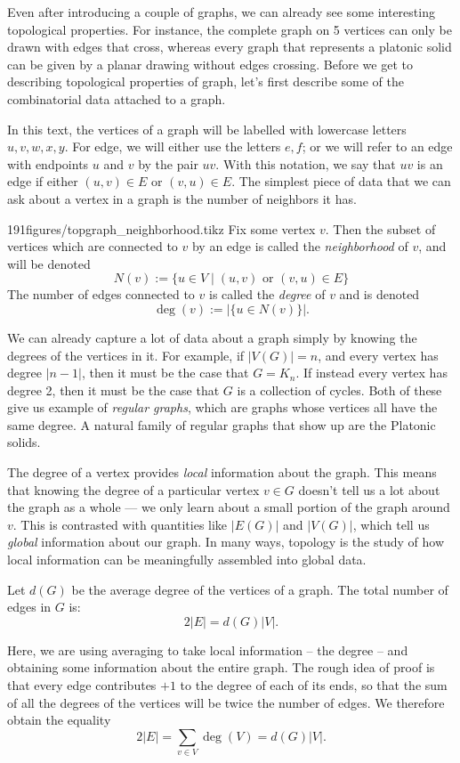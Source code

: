 Even after introducing a couple of graphs, we can already see some interesting topological properties.
For instance, the complete graph on 5 vertices can only be drawn with edges that cross, whereas every graph that represents a platonic solid can be given by a planar drawing without edges crossing.
Before we get to describing topological properties of graph, let's first describe some of the combinatorial data attached to a graph. 

In this text, the vertices of a graph will be labelled with lowercase letters $u, v, w, x, y.$
For edge, we will either use the letters $e, f$; or we will refer to an edge with endpoints $u$ and $v$ by the pair $uv$. With this notation, we say that $uv$ is an edge if either $(u, v)\in E$ or $(v, u)\in E$. 
The simplest piece of data that we can ask about a vertex in a graph is the number of neighbors it has.  
\begin{definitionfigureenv}[Neighborhood]{191figures/topgraph_neighborhood.tikz}
	Fix some vertex $v$. Then the subset of vertices which are connected to $v$ by an edge is called the \emph{neighborhood} of $v$, and will be denoted 
	\[N(v):=\{u\in V \;|\; (u,v) \text{ or } (v, u)\in E\}\]
	 The number of edges connected to $v$ is called the \emph{degree} of $v$ and is denoted 
	\[\deg(v):=|\{u \in N(v)\}|.\]
\end{definitionfigureenv}

We can already capture a lot of data about a graph simply by knowing the degrees of the vertices in it.
For example, if $|V(G)|=n$, and every vertex has degree $|n-1|$, then it must be the case that $G=K_n$.
If instead every vertex has degree 2, then it must be the case that $G$ is a collection of cycles.
Both of these give us example of  \emph{regular graphs}, which are graphs whose vertices all have the same degree.
A natural family of regular graphs that show up are the Platonic solids.

The degree of a vertex provides \emph{local} information about the graph.
This means that knowing the degree of a particular vertex $v\in G$ doesn't tell us a lot about the graph as a whole --- we only learn about a small portion of the graph around $v$.
This is contrasted with quantities like $|E(G)|$ and $|V(G)|$, which tell us \emph{global} information about our graph. 
In many ways, topology is the study of how local information can be meaningfully assembled into global data. 
\begin{claim}
Let $d(G)$ be the average degree of the vertices of a graph.
The total number of edges in $G$ is:
\[2|E|=d(G)|V|.\]
\label{claim:avgdegree}
\end{claim}
Here, we are using averaging to take local information -- the degree -- and obtaining some information about the entire graph. 
The rough idea of proof is that every edge contributes $+1$ to the degree of each of its ends, so that the sum of all the degrees of the vertices will be twice the number of edges. 
We therefore obtain the equality 
\[2|E|= \sum_{v\in V} \deg(V)= d(G)|V|.\]

